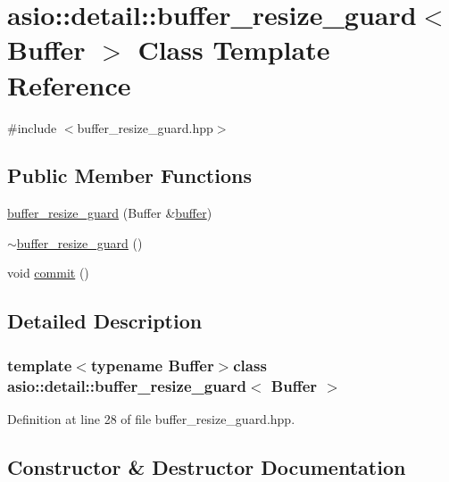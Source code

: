 \hypertarget{classasio_1_1detail_1_1buffer__resize__guard}{}\section{asio\+:\+:detail\+:\+:buffer\+\_\+resize\+\_\+guard$<$ Buffer $>$ Class Template Reference}
\label{classasio_1_1detail_1_1buffer__resize__guard}


{\ttfamily \#include $<$buffer\+\_\+resize\+\_\+guard.\+hpp$>$}

\subsection*{Public Member Functions}
\begin{DoxyCompactItemize}
\item 
\hyperlink{classasio_1_1detail_1_1buffer__resize__guard_a75c19d8c4321ce665abd5c4964d4e42d}{buffer\+\_\+resize\+\_\+guard} (Buffer \&\hyperlink{group__buffer_ga1ed66e401559cbfd19595392f653b47c}{buffer})
\item 
\hyperlink{classasio_1_1detail_1_1buffer__resize__guard_a52be66e6bab81f3efd9fc3c1b6b5fcae}{$\sim$buffer\+\_\+resize\+\_\+guard} ()
\item 
void \hyperlink{classasio_1_1detail_1_1buffer__resize__guard_a10b8194b6b31a72f2b9a40582c016a77}{commit} ()
\end{DoxyCompactItemize}


\subsection{Detailed Description}
\subsubsection*{template$<$typename Buffer$>$class asio\+::detail\+::buffer\+\_\+resize\+\_\+guard$<$ Buffer $>$}



Definition at line 28 of file buffer\+\_\+resize\+\_\+guard.\+hpp.



\subsection{Constructor \& Destructor Documentation}
\hypertarget{classasio_1_1detail_1_1buffer__resize__guard_a75c19d8c4321ce665abd5c4964d4e42d}{}

